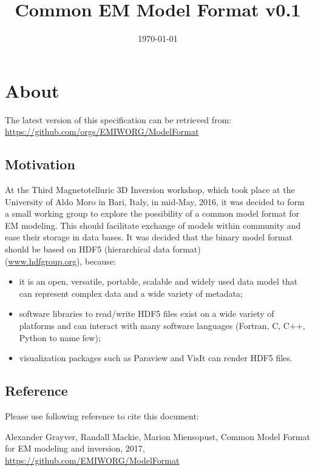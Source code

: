 \documentclass[10pt,a4paper]{article}
\title{\textbf{Common EM Model Format v0.1}} \date{\today}
\begin{document}
\maketitle
\newpage
\tableofcontents
{}
\newpage

\section{About}

The latest version of this specification can be retrieved from: \url{https://github.com/orgs/EMIWORG/ModelFormat}

\subsection{Motivation}

At the Third Magnetotelluric 3D Inversion workshop, which took place at the University of Aldo Moro in Bari, Italy, in mid-May, 2016, it was decided to form a small working group to explore the possibility of a common model format for EM modeling. This should facilitate exchange of models within community and ease their storage in data bases. It was decided that the binary model format should be based on HDF5 (hierarchical data format) \\(\textcolor[rgb]{0,0,1}{\underline{www.hdfgroup.org}}), because:

\begin{itemize}
	\item it is an open, versatile, portable, scalable and widely used data model that can represent complex data and a wide variety of metadata;
  \item software libraries to read/write HDF5 files exist on a 
wide variety of platforms and can interact with many software languages (Fortran, C, C++, Python to name few);
  \item visualization packages such as Paraview and VisIt can render HDF5 files. 
\end{itemize}

\subsection{Reference}
\label{sec:ref}

Please use following reference to cite this document:

Alexander Grayver, Randall Mackie, Marion Miensopust, Common Model Format for EM modeling and inversion, 2017, \url{https://github.com/EMIWORG/ModelFormat}
\end{document}
